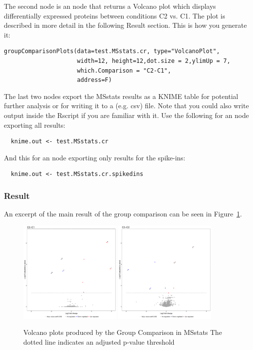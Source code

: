 \noindent The second node is an  node that returns a Volcano plot which displays differentially expressed
proteins between conditions C2 vs. C1. The plot is described in more detail in the following Result section. This is how you generate it:
\begin{lstlisting}
groupComparisonPlots(data=test.MSstats.cr, type="VolcanoPlot",
                     width=12, height=12,dot.size = 2,ylimUp = 7,
                     which.Comparison = "C2-C1",
                     address=F)
\end{lstlisting}

\noindent The last two nodes export the MSstats results as a KNIME table for potential further analysis or for writing it to a (e.g. csv) file. Note that you could also write output inside the Rscript if you are familiar with it.
Use the following for an  node exporting all results:
\begin{lstlisting}
  knime.out <- test.MSstats.cr
\end{lstlisting}
And this for an  node exporting only results for the spike-ins:
\begin{lstlisting}
  knime.out <- test.MSstats.cr.spikedins
\end{lstlisting}


\subsubsection{Result}
An excerpt of the main result of the group comparison can be seen in Figure~\ref{fig:msstats_1}.

\begin{figure}[htbp]
	\centering
	\includegraphics[width=0.45\textwidth]{graphics/labelfree/msstats/c2_c1.pdf}
	\qquad
	\includegraphics[width=0.45\textwidth]{graphics/labelfree/msstats/c3_c2.pdf}
	\caption{Volcano plots produced by the Group Comparison in MSstats
	The dotted line indicates an adjusted p-value threshold}
	\label{fig:msstats_1}
\end{figure}

